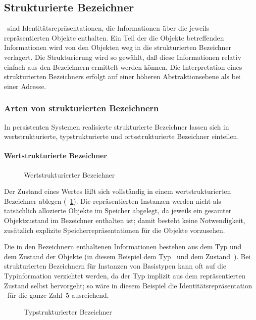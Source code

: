 \subsection{Strukturierte Bezeichner}
%
\ sind
Identit\"{a}tsrepr\"{a}sentationen, die Informationen \"{u}ber die jeweils
repr\"{a}sentierten Objekte enthalten.  Ein Teil der die Objekte
betreffenden Informationen wird von den Objekten weg in die
strukturierten Bezeichner verlagert. Die Strukturierung wird so
gew\"{a}hlt, da\ss{} diese Informationen relativ einfach aus den Bezeichnern
ermittelt werden k\"{o}nnen. Die Interpretation eines strukturierten
Bezeichners erfolgt auf einer h\"{o}heren Abstraktionsebene als bei einer
Adresse.
%
\subsubsection{Arten von strukturierten Bezeichnern}
%
In persistenten Systemen realisierte strukturierte Bezeichner
lassen sich in wertstrukturierte, typ\-struk\-tu\-rier\-te und
ortsstrukturierte Bezeichner einteilen.
%
\paragraph{Wertstrukturierte Bezeichner}
%
\begin{figure}[htbp]%
\ifbuch%
\centerline{}%
\else%
\centerline{}%
\fi%
\caption{Wertstrukturierter Bezeichner}\label{fig:stridval}%
\end{figure}%
%
Der Zustand eines Wertes l\"{a}\ss{}t sich vollst\"{a}ndig in einem
wertstrukturierten Bezeichner ablegen (\figurename~\ref{fig:stridval}).
Die repr\"{a}sentierten Instanzen werden nicht als tats\"{a}chlich
allozierte Objekte im Speicher abgelegt, da jeweils ein gesamter
Objektzustand im Bezeichner enthalten ist; damit besteht keine
Notwendigkeit, zus\"{a}tzlich explizite Speicherrepr\"{a}sentationen f\"{u}r
die Objekte vorzusehen.
%
\par{}Die in den Bezeichnern enthaltenen Informationen
bestehen aus dem Typ und dem Zustand der Objekte (in diesem Beispiel
dem Typ \ und dem Zustand~). Bei
strukturierten Bezeichnern f\"{u}r Instanzen von Basistypen kann oft auf
die Typinformation verzichtet werden, da der Typ implizit aus dem
repr\"{a}sentierten Zustand selbst hervorgeht; so w\"{a}re in diesem
Beispiel die Identit\"{a}tsrepr\"{a}sentation \ f\"{u}r die
ganze Zahl~5 ausreichend.
%
\begin{figure}[htbp]%
\ifbuch%
\centerline{}%
\else%
\centerline{}%
\fi%
\caption{Typstrukturierter Bezeichner}\label{fig:stridtyp}%
\end{figure}%
%
